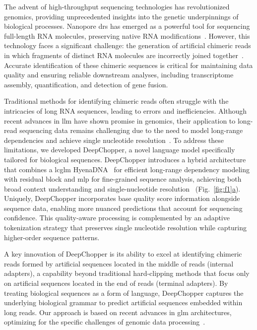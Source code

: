 \documentclass[pdflatex, sn-mathphys-num, lineno]{sn-jnl}%
\newcommand{\figref}[2]{Fig.~\hyperref[#1]{\ref*{#1}#2}}
\theoremstyle{thmstyleone}%
\theoremstyle{thmstyletwo}%
\theoremstyle{thmstylethree}%
\begin{document}
The advent of high-throughput sequencing technologies has revolutionized genomics, providing unprecedented insights into the genetic underpinnings of biological processes.
Nanopore \gls{drs} has emerged as a powerful tool for sequencing full-length RNA molecules, preserving native RNA modifications~\cite{ozsolak2009direct, garalde2018highly, jain2022advances}.
However, this technology faces a significant challenge: the generation of artificial chimeric reads in which fragments of distinct RNA molecules are incorrectly joined together~\cite{smith2020molecular}.
Accurate identification of these chimeric sequences is critical for maintaining data quality and ensuring reliable downstream analyses, including transcriptome assembly, quantification, and detection of gene fusion.

Traditional methods for identifying chimeric reads often struggle with the intricacies of long RNA sequences, leading to errors and inefficiencies.
Although recent advances in \gls{llm} have shown promise in genomics, their application to long-read sequencing data remains challenging due to the need to model long-range dependencies and achieve single nucleotide resolution~\cite{dalla2023nucleotide, tay2022efficient, zhou2023dnabert2}.
To address these limitations, we developed DeepChopper, a novel language model specifically tailored for biological sequences.
DeepChopper introduces a hybrid architecture that combines a \gls{lcglm} HyenaDNA~\cite{nguyen2024hyenadna} for efficient long-range dependency modeling with residual block and \gls{mlp} for fine-grained sequence analysis, achieving both broad context understanding and single-nucleotide resolution~\cite{poli2023hyena, he2016deep} (\figref{fig:f1}{a}).
Uniquely, DeepChopper incorporates base quality score information alongside sequence data, enabling more nuanced predictions that account for sequencing confidence.
This quality-aware processing is complemented by an adaptive tokenization strategy that preserves single nucleotide resolution while capturing higher-order sequence patterns.

A key innovation of DeepChopper is its ability to excel at identifying chimeric reads formed by artificial sequences located in the middle of reads (internal adapters), a capability beyond traditional hard-clipping methods that focus only on artificial sequences located in the end of reads (terminal adapters).
By treating biological sequences as a form of language, DeepChopper captures the underlying biological grammar to predict artificial sequences embedded within long reads.
Our approach is based on recent advances in \gls{glm} architectures, optimizing for the specific challenges of genomic data processing~\cite{nguyen2024hyenadna}.
\end{document}
